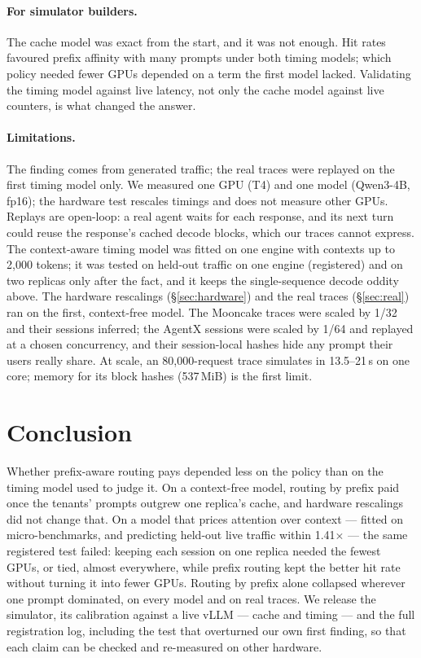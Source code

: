 \documentclass[10pt,twocolumn]{article}
\begin{document}
\paragraph{For simulator builders.} The cache model was exact from the start, and it was not enough.
Hit rates favoured prefix affinity with many prompts under both timing models; which policy needed
fewer GPUs depended on a term the first model lacked. Validating the timing model against live
latency, not only the cache model against live counters, is what changed the answer.

\paragraph{Limitations.} The finding comes from generated traffic; the real traces were replayed on
the first timing model only. We measured one GPU (T4) and one model (Qwen3-4B, fp16); the hardware test rescales
timings and does not measure other GPUs. Replays are open-loop: a real agent waits for each response,
and its next turn could reuse the response's cached decode blocks, which our traces cannot express.
The context-aware timing model was fitted on one engine with contexts up to 2{,}000 tokens; it was
tested on held-out traffic on one engine (registered) and on two replicas only after the fact, and
it keeps the single-sequence decode oddity above. The hardware rescalings (\S\ref{sec:hardware}) and
the real traces (\S\ref{sec:real}) ran on the first, context-free model. The Mooncake traces were
scaled by 1/32 and their
sessions inferred; the AgentX sessions were scaled by 1/64 and replayed at a chosen concurrency, and
their session-local hashes hide any prompt their users really share. At scale, an
80{,}000-request trace simulates in 13.5--21\,s on one core; memory for its block hashes (537\,MiB) is
the first limit.

\section{Conclusion}

Whether prefix-aware routing pays depended less on the policy than on the timing model used to judge
it. On a context-free model, routing by prefix paid once the tenants' prompts outgrew one replica's
cache, and hardware rescalings did not change that. On a model that prices attention over context ---
fitted on micro-benchmarks, and predicting held-out live traffic within 1.41$\times$ --- the same
registered test failed: keeping each session on one replica needed the fewest GPUs, or tied,
almost everywhere, while prefix routing kept the better hit rate without turning it into fewer GPUs.
Routing by prefix alone collapsed wherever one prompt dominated, on every model and on real traces. We
release the simulator, its calibration against a live vLLM --- cache and timing --- and the full
registration log, including the test that overturned our own first finding, so that each claim can
be checked and re-measured on other hardware.
\end{document}
